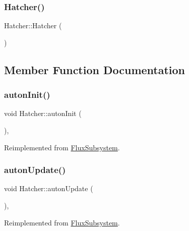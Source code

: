 \subsubsection{\texorpdfstring{Hatcher()}{Hatcher()}}
{\footnotesize\ttfamily Hatcher\+::\+Hatcher (\begin{DoxyParamCaption}{ }\end{DoxyParamCaption})}



\subsection{Member Function Documentation}
\mbox{\label{classHatcher_ac44bea31eb17578106c48914450a1be1}} 
\subsubsection{\texorpdfstring{auton\+Init()}{autonInit()}}
{\footnotesize\ttfamily void Hatcher\+::auton\+Init (\begin{DoxyParamCaption}{ }\end{DoxyParamCaption})\hspace{0.3cm}{\ttfamily [override]}, {\ttfamily [virtual]}}



Reimplemented from \hyperlink{classFluxSubsystem_a142cb34f612412e26bd0049e037dbe60}{Flux\+Subsystem}.

\mbox{\label{classHatcher_a5e21dc019a7f05b4bbbf39545a920f5a}} 
\subsubsection{\texorpdfstring{auton\+Update()}{autonUpdate()}}
{\footnotesize\ttfamily void Hatcher\+::auton\+Update (\begin{DoxyParamCaption}{ }\end{DoxyParamCaption})\hspace{0.3cm}{\ttfamily [override]}, {\ttfamily [virtual]}}



Reimplemented from \hyperlink{classFluxSubsystem_aceed900af22503022b8d1278f3693f77}{Flux\+Subsystem}.

